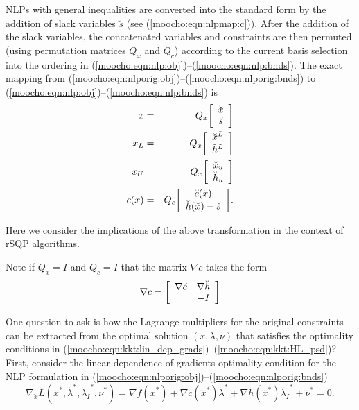 \documentclass[pdf,12pt,report]{SANDreport}
\begin{document}
NLPs with general inequalities are converted into the standard form by
the addition of slack variables $\breve{s}$ (see
(\ref{moocho:eqn:nlpmap:c})).  After the addition of the slack
variables, the concatenated variables and constraints are then
permuted (using permutation matrices $Q_x$ and $Q_c$) according to the
current basis selection into the ordering in
(\ref{moocho:eqn:nlp:obj})--(\ref{moocho:eqn:nlp:bnds}).  The exact
mapping from
(\ref{moocho:eqn:nlporig:obj})--(\ref{moocho:eqn:nlporig:bnds}) to
(\ref{moocho:eqn:nlp:obj})--(\ref{moocho:eqn:nlp:bnds}) is
%
{\bsinglespace
\begin{eqnarray}
x & = & Q_x {\bmat{c} \breve{x} \\ \breve{s} \emat} \label{moocho:eqn:nlpmap:x} \\
x_L & = & Q_x {\bmat{c} \breve{x}^L \\ \breve{h}^L \emat} \label{moocho:eqn:nlpmap:xl} \\
x_U & = & Q_x {\bmat{c} \breve{x}_u \\ \breve{h}_u \emat} \label{moocho:eqn:nlpmap:xu} \\
c(x) & = & Q_c {\bmat{c} \breve{c}(\breve{x}) \\ \breve{h}(\breve{x}) - \breve{s} \emat}.
\label{moocho:eqn:nlpmap:c}
\end{eqnarray}
\esinglespace}

Here we consider the implications of the above transformation in the context
of rSQP algorithms.

Note if $Q_x = I$ and $Q_c = I$ that the matrix $\nabla c$ takes the form
%
\begin{equation}
\nabla c = {\bmat{cc} \nabla \breve{c} & \nabla \breve{h} \\ & -I \emat}
	\label{moocho:eqn:Gc_orig}
\end{equation}

One question to ask is how the Lagrange multipliers for the original
constraints can be extracted from the optimal solution $(x,\lambda,\nu)$ that
satisfies the optimality conditions in
(\ref{moocho:eqn:kkt:lin_dep_grads})--(\ref{moocho:eqn:kkt:HL_psd})?  First,
consider the linear dependence of gradients optimality condition for the NLP
formulation in (\ref{moocho:eqn:nlporig:obj})--(\ref{moocho:eqn:nlporig:bnds})
%
\begin{equation}
\nabla_{\breve{x}} \breve{L}(\breve{x}^*,\breve{\lambda}^*,\breve{\lambda_I}^*,\breve{\nu}^*)
= \nabla \breve{f}(\breve{x}^*) + \nabla \breve{c}(\breve{x}^*) \breve{\lambda}^*
+ \nabla \breve{h}(\breve{x}^*) \breve{\lambda_I}^* + \breve{\nu}^* = 0.
\label{moocho:eqn:kktorig:lin_dep_grads}
\end{equation}
\end{document}
